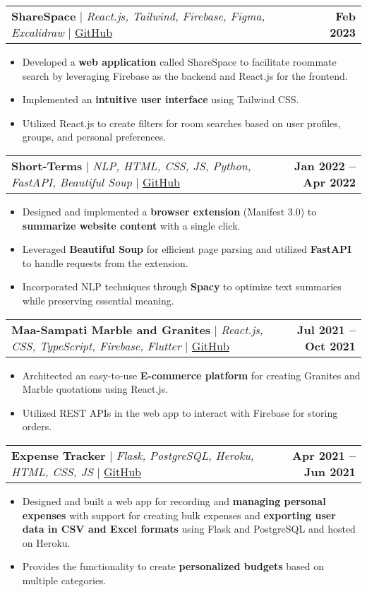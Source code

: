 \documentclass[letterpaper,11pt]{article}
\makeatletter
\newcommand{\resumeItem}[1]{
  \item\small{
    {#1 \vspace{-2pt}}
  }
}
\newcommand{\resumeProjectHeading}[2]{
    \item
    \begin{tabular*}{1.001\textwidth}{l@{\extracolsep{\fill}}r}
      \small#1 & \textbf{\small #2}\\
    \end{tabular*}\vspace{-7pt}
}
\newcommand{\resumeItemListStart}{\begin{itemize}}
\newcommand{\resumeItemListEnd}{\end{itemize}\vspace{-5pt}}
\makeatother
\begin{document}
        
        \resumeProjectHeading
            {\textbf{\normalsize{ShareSpace}} $|$ \emph{React.js, Tailwind, Firebase, Figma, Excalidraw} $|$ \href{https://github.com/viveknamaye/ShareSpace}{GitHub}}{Feb 2023}
            \resumeItemListStart
                \resumeItem{Developed a \textbf{web application} called ShareSpace to facilitate roommate search by leveraging Firebase as the backend and React.js for the frontend.}
                \resumeItem{Implemented an \textbf{intuitive user interface} using Tailwind CSS.}
                \resumeItem{Utilized React.js to create filters for room searches based on user profiles, groups, and personal preferences.}
            \resumeItemListEnd
        \vspace{-19pt}

        
        \resumeProjectHeading
            {\textbf{\normalsize{Short-Terms}} $|$ \emph{NLP, HTML, CSS, JS, Python, FastAPI, Beautiful Soup} $|$ \href{https://github.com/PranavDani/short-terms}{GitHub}}{Jan 2022 -- Apr 2022}
            \resumeItemListStart
                \resumeItem{Designed and implemented a \textbf{browser extension} (Manifest 3.0) to \textbf{summarize website content} with a single click.}
                \resumeItem{Leveraged \textbf{Beautiful Soup} for efficient page parsing and utilized \textbf{FastAPI} to handle requests from the extension.}
                \resumeItem{Incorporated NLP techniques through \textbf{Spacy} to optimize text summaries while preserving essential meaning.}
            \resumeItemListEnd
        \vspace{-19pt}


        \resumeProjectHeading
            {\textbf{\normalsize{Maa-Sampati Marble and Granites}} $|$ \emph{React.js, CSS, TypeScript, Firebase, Flutter} $|$ \href{https://github.com/PranavDani/maa-sampati}{GitHub}}{Jul 2021 -- Oct 2021}
            \resumeItemListStart
                \resumeItem{Architected an easy-to-use \textbf{E-commerce platform} for creating Granites and Marble quotations using React.js.}
                \resumeItem{Utilized REST APIs in the web app to interact with Firebase for storing orders.}
            \resumeItemListEnd
        \vspace{-19pt}

        \resumeProjectHeading
            {\textbf{\normalsize{Expense Tracker}} $|$ \emph{Flask, PostgreSQL, Heroku, HTML, CSS, JS} $|$ \href{https://github.com/PranavDani/Expense-Tracker}{GitHub}}{Apr 2021 -- Jun 2021}
            \resumeItemListStart
                \resumeItem{Designed and built a web app for recording and \textbf{managing personal expenses} with support for creating bulk expenses and \textbf{exporting user data in CSV and Excel formats} using Flask and PostgreSQL and hosted on Heroku.}
                \resumeItem{Provides the functionality to create \textbf{personalized budgets} based on multiple categories.}
            \resumeItemListEnd       
        
\end{document}
